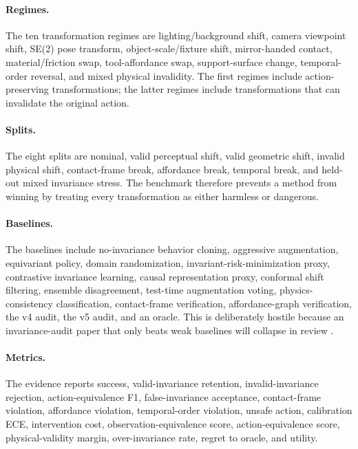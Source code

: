 \documentclass{article}
\begin{document}
\paragraph{Regimes.} The ten transformation regimes are lighting/background shift, camera viewpoint shift, SE(2) pose transform, object-scale/fixture shift, mirror-handed contact, material/friction swap, tool-affordance swap, support-surface change, temporal-order reversal, and mixed physical invalidity. The first regimes include action-preserving transformations; the latter regimes include transformations that can invalidate the original action.

\paragraph{Splits.} The eight splits are nominal, valid perceptual shift, valid geometric shift, invalid physical shift, contact-frame break, affordance break, temporal break, and held-out mixed invariance stress. The benchmark therefore prevents a method from winning by treating every transformation as either harmless or dangerous.


\paragraph{Baselines.} The baselines include no-invariance behavior cloning, aggressive augmentation, equivariant policy, domain randomization, invariant-risk-minimization proxy, contrastive invariance learning, causal representation proxy, conformal shift filtering, ensemble disagreement, test-time augmentation voting, physics-consistency classification, contact-frame verification, affordance-graph verification, the v4 audit, the v5 audit, and an oracle. This is deliberately hostile because an invariance-audit paper that only beats weak baselines will collapse in review \citep{tobin2017domain,arjovsky2019invariant,zeng2020transporter,mandlekar2021robomimic,angelopoulos2021conformal,brohan2022rt1}.

\paragraph{Metrics.} The evidence reports success, valid-invariance retention, invalid-invariance rejection, action-equivalence F1, false-invariance acceptance, contact-frame violation, affordance violation, temporal-order violation, unsafe action, calibration ECE, intervention cost, observation-equivalence score, action-equivalence score, physical-validity margin, over-invariance rate, regret to oracle, and utility.
\end{document}
